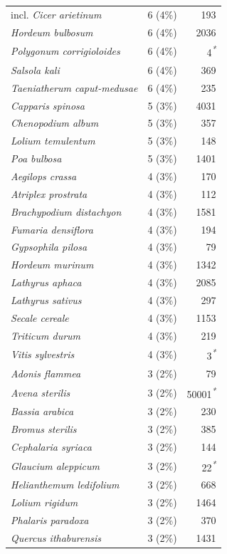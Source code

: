 \documentclass[
  authoryear,
  review]{elsarticle}
\begin{document}
\begin{table}
{\begin{tabular*}{\linewidth}{@{\extracolsep{\fill}}lrr}
incl. \emph{Cicer arietinum} & 6 (4\%) & 193 \\ 
\emph{Hordeum bulbosum} & 6 (4\%) & 2036 \\ 
\emph{Polygonum corrigioloides} & 6 (4\%) & 4\textsuperscript{\textit{*}} \\ 
\emph{Salsola kali} & 6 (4\%) & 369 \\ 
\emph{Taeniatherum caput-medusae} & 6 (4\%) & 235 \\ 
\emph{Capparis spinosa} & 5 (3\%) & 4031 \\ 
\emph{Chenopodium album} & 5 (3\%) & 357 \\ 
\emph{Lolium temulentum} & 5 (3\%) & 148 \\ 
\emph{Poa bulbosa} & 5 (3\%) & 1401 \\ 
\emph{Aegilops crassa} & 4 (3\%) & 170 \\ 
\emph{Atriplex prostrata} & 4 (3\%) & 112 \\ 
\emph{Brachypodium distachyon} & 4 (3\%) & 1581 \\ 
\emph{Fumaria densiflora} & 4 (3\%) & 194 \\ 
\emph{Gypsophila pilosa} & 4 (3\%) & 79 \\ 
\emph{Hordeum murinum} & 4 (3\%) & 1342 \\ 
\emph{Lathyrus aphaca} & 4 (3\%) & 2085 \\ 
\emph{Lathyrus sativus} & 4 (3\%) & 297 \\ 
\emph{Secale cereale} & 4 (3\%) & 1153 \\ 
\emph{Triticum durum} & 4 (3\%) & 219 \\ 
\emph{Vitis sylvestris} & 4 (3\%) & 3\textsuperscript{\textit{*}} \\ 
\emph{Adonis flammea} & 3 (2\%) & 79 \\ 
\emph{Avena sterilis} & 3 (2\%) & 50001\textsuperscript{\textit{*}} \\ 
\emph{Bassia arabica} & 3 (2\%) & 230 \\ 
\emph{Bromus sterilis} & 3 (2\%) & 385 \\ 
\emph{Cephalaria syriaca} & 3 (2\%) & 144 \\ 
\emph{Glaucium aleppicum} & 3 (2\%) & 22\textsuperscript{\textit{*}} \\ 
\emph{Helianthemum ledifolium} & 3 (2\%) & 668 \\ 
\emph{Lolium rigidum} & 3 (2\%) & 1464 \\ 
\emph{Phalaris paradoxa} & 3 (2\%) & 370 \\ 
\emph{Quercus ithaburensis} & 3 (2\%) & 1431 \\ 

\end{tabular*}}
\end{table}
\end{document}
